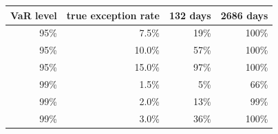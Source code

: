 \begin{tabular}{rrrr}
\toprule
VaR level & true exception rate & 132 days & 2686 days \\
\midrule
95\% & 7.5\% & 19\% & 100\% \\
95\% & 10.0\% & 57\% & 100\% \\
95\% & 15.0\% & 97\% & 100\% \\
99\% & 1.5\% & 5\% & 66\% \\
99\% & 2.0\% & 13\% & 99\% \\
99\% & 3.0\% & 36\% & 100\% \\
\bottomrule
\end{tabular}
